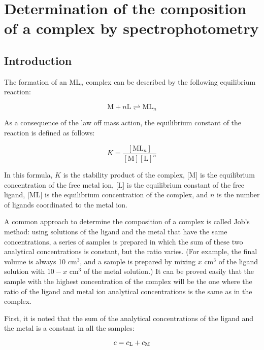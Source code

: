 \fancyhead[LO,RE]{\thesection}
\fancyfoot[LE,RO]{\thepage}

\section{Determination of the composition of a complex by spectrophotometry}
\subsection{Introduction}

The formation of an ML$_n$ complex can be described by the following equilibrium reaction:

\begin{equation}
\text{M} + n\text{L} \rightleftharpoons \text{ML}_n
\end{equation}

As a consequence of the law off mass action, the equilibrium constant of the reaction is defined as follows:

\begin{equation}
K = \frac{[ \text{ML}_n ]}{[ \text{M} ][ \text{L}]^n }
\end{equation}

In this formula, $K$ is the stability product of the complex, [M] is the equilibrium concentration of the free metal ion, [L] is the equilibrium constant of the free ligand, [ML] is the equilibrium concentration of the complex, and $n$ is the number of ligands coordinated to the metal ion.

A common approach to determine the composition of a complex is called Job's method: using solutions of the ligand and the metal that have the same concentrations, a series of samples is prepared in which the sum of these two analytical concentrations is constant, but the ratio varies. (For example, the final volume is always 10 cm$^3$, and a sample is prepared by mixing $x$ cm$^3$ of the ligand solution with $10-x$ cm$^3$ of the metal solution.) It can be proved easily that the sample with the highest concentration of the complex will be the one where the ratio of the ligand and metal ion analytical concentrations is the same as in the complex. 

First, it is noted that the sum of the analytical concentrations of the ligand and the metal is a constant in all the samples:

\begin{equation}
c = c_{\text L} + c_{\text M}
\end{equation}

